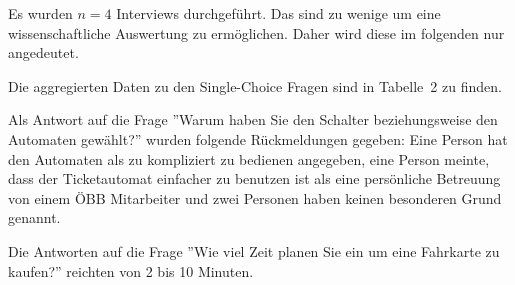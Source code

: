 \documentclass[]{article}
\begin{document}
Es wurden $n=4$ Interviews durchgeführt. Das sind zu wenige um eine wissenschaftliche Auswertung zu ermöglichen. Daher wird diese im folgenden nur angedeutet.

Die aggregierten Daten zu den Single-Choice Fragen sind in Tabelle~2 zu finden.

Als Antwort auf die Frage ''Warum haben Sie den Schalter beziehungsweise den Automaten gewählt?'' wurden folgende Rückmeldungen gegeben: Eine Person hat den Automaten als zu kompliziert zu bedienen angegeben, eine Person meinte, dass der Ticketautomat einfacher zu benutzen ist als eine persönliche Betreuung von einem ÖBB Mitarbeiter und zwei Personen haben keinen besonderen Grund genannt.

Die Antworten auf die Frage ''Wie viel Zeit planen Sie ein um eine Fahrkarte zu kaufen?'' reichten von 2 bis 10 Minuten.
\end{document}
